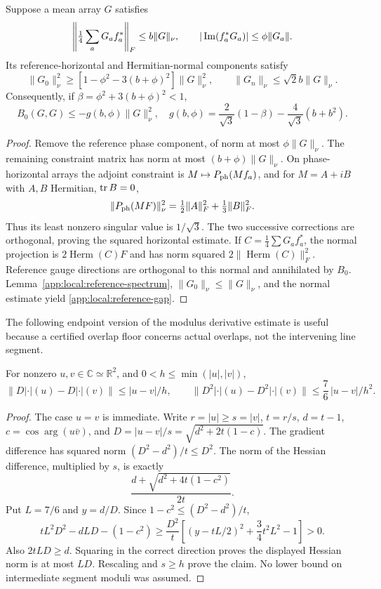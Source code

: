 \begin{lemma}\label{app:local:projection}
Suppose a mean array $G$ satisfies
\[
 \left\|\tfrac14\sum_aG_af_a^*\right\|_F\le b\|G\|_\nu,
 \qquad |\operatorname{Im}(f_a^*G_a)|\le\phi\|G_a\|.
\]
Its reference-horizontal and Hermitian-normal components satisfy
\[
 \|G_0\|_\nu^2\ge[1-\phi^2-3(b+\phi)^2]\|G\|_\nu^2,\qquad
 \|G_n\|_\nu\le\sqrt2 b\|G\|_\nu .
\]
Consequently, if $\beta=\phi^2+3(b+\phi)^2<1$,
\begin{equation}\label{app:local:reference-gap}
 B_0(G,G)\le-g(b,\phi)\|G\|_\nu^2,\quad
 g(b,\phi)=\frac2{\sqrt3}(1-\beta)
                         -\frac4{\sqrt3}(b+b^2).
\end{equation}
\end{lemma}
\begin{proof}
Remove the reference phase component, of norm at most $\phi\|G\|_\nu$.
The remaining constraint matrix has norm at most $(b+\phi)\|G\|_\nu$.
On phase-horizontal arrays the adjoint constraint is
$M\mapsto P_{\rm ph}(Mf_a)$, and for $M=A+iB$ with $A,B$ Hermitian,
$\operatorname{tr} B=0$,
\[
 \|P_{\rm ph}(MF)\|_\nu^2=\tfrac12\|A\|_F^2+\tfrac13\|B\|_F^2 .
\]
Thus its least nonzero singular value is $1/\sqrt3$.
The two successive corrections are orthogonal, proving the squared
horizontal estimate. If $C=\frac14\sum G_af_a^*$, the normal projection
is $2\operatorname{Herm}(C)F$ and has norm squared
$2\|\operatorname{Herm}(C)\|_F^2$. Reference gauge directions are
orthogonal to this normal and annihilated by $B_0$.
Lemma~\ref{app:local:reference-spectrum}, $\|G_0\|_\nu\le\|G\|_\nu$,
and the normal estimate yield \eqref{app:local:reference-gap}.
\end{proof}

The following endpoint version of the modulus derivative estimate is
useful because a certified overlap floor concerns actual overlaps,
not the intervening line segment.
\begin{lemma}\label{app:local:endpoint-hessian}
For nonzero $u,v\in\mathbb C\simeq\mathbb R^2$, and
$0<h\le\min(|u|,|v|)$,
\[
 \|D|\cdot|(u)-D|\cdot|(v)\|\le |u-v|/h,\qquad
 \|D^2|\cdot|(u)-D^2|\cdot|(v)\|
                           \le\frac76\,|u-v|/h^2 .
\]
\end{lemma}
\begin{proof}
The case $u=v$ is immediate. Write $r=|u|\ge s=|v|$,
$t=r/s$, $d=t-1$, $c=\cos\arg(u\bar v)$, and
$D=|u-v|/s=\sqrt{d^2+2t(1-c)}$.
The gradient difference has squared norm $(D^2-d^2)/t\le D^2$.
The norm of the Hessian difference, multiplied by $s$, is exactly
\[
 \frac{d+\sqrt{d^2+4t(1-c^2)}}{2t}.
\]
Put $L=7/6$ and $y=d/D$. Since
$1-c^2\le(D^2-d^2)/t$,
\[
 tL^2D^2-dLD-(1-c^2)
 \ge\frac{D^2}{t}\left[(y-tL/2)^2+\frac34t^2L^2-1\right]>0.
\]
Also $2tLD\ge d$. Squaring in the correct direction proves the displayed
Hessian norm is at most $LD$. Rescaling and $s\ge h$ prove the claim.
No lower bound on intermediate segment moduli was assumed.
\end{proof}

